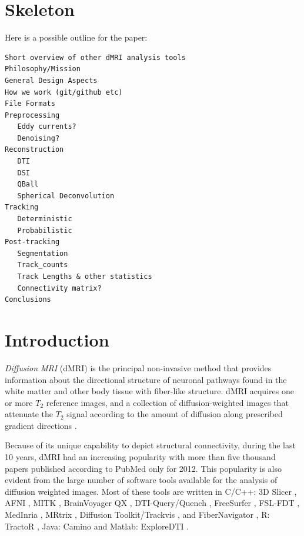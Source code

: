 \documentclass{bioinfo}
\begin{document}
\section{Skeleton}

Here is a possible outline for the paper:

\begin{verbatim}
Short overview of other dMRI analysis tools
Philosophy/Mission
General Design Aspects
How we work (git/github etc)
File Formats 
Preprocessing
   Eddy currents?
   Denoising?
Reconstruction
   DTI 
   DSI
   QBall
   Spherical Deconvolution 
Tracking
   Deterministic
   Probabilistic
Post-tracking
   Segmentation
   Track_counts
   Track Lengths & other statistics
   Connectivity matrix?
Conclusions
\end{verbatim}


\section{Introduction}

\emph{Diffusion MRI} (dMRI) \citep{stejskal-tanner:65, lebihan-breton:85,merboldt-hanicke-etal:85, taylor-bushell:85, callaghan:91} is the principal non-invasive method that provides information about the directional structure of neuronal pathways found in the white matter and other body tissue with fiber-like structure. dMRI acquires one or 
more $T_{2}$ reference images, and a collection of diffusion-weighted images that attenuate the $T_{2}$ signal according to the amount of diffusion along prescribed gradient directions \citep{behrens-johansen-berg:09, jones:10}. 

Because of its unique capability to depict structural connectivity, during the last 10 years, dMRI had an increasing popularity with more than five thousand papers published according to PubMed only for 2012. This popularity is also evident from the large number of software tools available for the analysis of diffusion weighted images. Most of these tools are written in C/C++: 3D Slicer \citep{pieper:06}, AFNI \citep{cox-afni:12}, MITK \citep{fritzsche-mitk:12}, BrainVoyager QX \citep{goebel-brainvoyager:12}, DTI-Query/Quench \citep{sherbondy:05}, FreeSurfer \citep{fischl-freesurfer:12}, FSL-FDT \citep{smith-fdt:04}, MedInria \citep{toussaint-souplet-etal:07}, MRtrix \citep{Tournier2012}, Diffusion Toolkit/Trackvis \citep{wang-diffusion-toolkit:07}, and FiberNavigator \citep{vaillancourt:11, chamberland:13}, R: TractoR \citep{ clayden-TractoR:11}, Java: Camino \citep{Cook2006} and Matlab: ExploreDTI \citep{leemans-exploredti:09}. 
\end{document}
